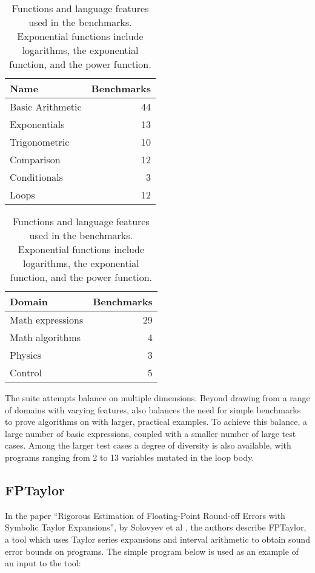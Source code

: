 \documentclass[main.tex]{subfiles}
\begin{document}
\begin{table}[hbtp]
  \begin{minipage}[t]{.45\textwidth}
    \begin{tabular}{lr}
      Name & Benchmarks \\\hline
      Basic Arithmetic & 44 \\
      Exponentials & 13 \\
      Trigonometric & 10 \\
      Comparison & 12 \\
      Conditionals & 3 \\
      Loops & 12
    \end{tabular}
    \caption{Domains from which the \name benchmarks are taken. The
      mathematical expressions are the smallest, and are largely
      drawn from \textit{Numerical Methods for Scientists and
        Engineers}~\cite{hamming-1987}.}
    \label{tbl:domains}
  \end{minipage}
  \hfill
  \begin{minipage}[t]{.45\textwidth}
    \begin{tabular}{lr}
      Domain & Benchmarks \\\hline
      Math expressions & 29 \\
      Math algorithms & 4 \\
      Physics & 3 \\
      Control & 5
    \end{tabular}
    \caption{Functions and language features used in the \name
      benchmarks. Exponential functions include logarithms, the
      exponential function, and the power function.}
    \label{tbl:features}
  \end{minipage}
\end{table}

The \name suite attempts balance on multiple dimensions.
Beyond drawing from a range of domains with varying features,
  \name also balances the need for simple benchmarks
  to prove algorithms on
  with larger, practical examples.
To achieve this balance,
  a large number of basic expressions,
  coupled with a smaller number of large test cases.
Among the larger test cases a degree of diversity is also available,
  with programs ranging
  from 2 to 13 variables mutated in the loop body.

\subsection{FPTaylor}
In the paper ``Rigorous Estimation of Floating-Point Round-off Errors
with Symbolic Taylor Expansions'', by Solovyev et al
\cite{fptaylor-fm15}, the authors describe FPTaylor, a tool which uses Taylor
series expansions and interval arithmetic to obtain sound error bounds
on programs. The simple program below is used as an example of an input
to the tool:
\end{document}
